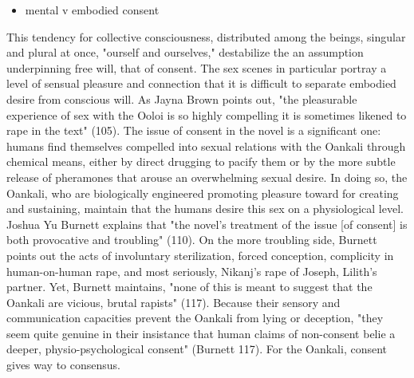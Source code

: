 \documentclass[11pt]{article}
\begin{document}
\begin{itemize}
\item mental v embodied consent
\end{itemize}
This tendency for collective consciousness, distributed among the
beings, singular and plural at once, "ourself and ourselves,"
destabilize the an assumption underpinning free will, that of
consent. The sex scenes in particular portray a level of sensual
pleasure and connection that it is difficult to separate embodied
desire from conscious will. As Jayna Brown points out, "the
pleasurable experience of sex with the Ooloi is so highly compelling
it is sometimes likened to rape in the text" (105). The issue of
consent in the novel is a significant one: humans find themselves
compelled into sexual relations with the Oankali through chemical
means, either by direct drugging to pacify them or by the more subtle
release of pheramones that arouse an overwhelming sexual desire.  In
doing so, the Oankali, who are biologically engineered promoting
pleasure toward for creating and sustaining, maintain that the humans
desire this sex on a physiological level. Joshua Yu Burnett explains
that "the novel's treatment of the issue [of consent] is both
provocative and troubling" (110). On the more troubling side, Burnett
points out the acts of involuntary sterilization, forced conception,
complicity in human-on-human rape, and most seriously, Nikanj's rape
of Joseph, Lilith's partner. Yet, Burnett maintains, "none of this is
meant to suggest that the Oankali are vicious, brutal rapists"
(117). Because their sensory and communication capacities prevent the
Oankali from lying or deception, "they seem quite genuine in their
insistance that human claims of non-consent belie a deeper,
physio-psychological consent" (Burnett 117). For the Oankali, consent
gives way to consensus. 
\end{document}
